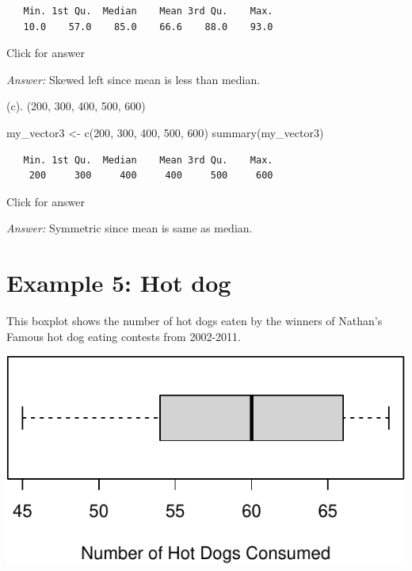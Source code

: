 \documentclass[
]{book}
\newenvironment{Shaded}{\begin{snugshade}}{\end{snugshade}}
\newcommand{\AttributeTok}[1]{\textcolor[rgb]{0.77,0.63,0.00}{#1}}
\newcommand{\DecValTok}[1]{\textcolor[rgb]{0.00,0.00,0.81}{#1}}
\newcommand{\FunctionTok}[1]{\textcolor[rgb]{0.00,0.00,0.00}{#1}}
\newcommand{\NormalTok}[1]{#1}
\newcommand{\OtherTok}[1]{\textcolor[rgb]{0.56,0.35,0.01}{#1}}
\newcommand{\SpecialCharTok}[1]{\textcolor[rgb]{0.00,0.00,0.00}{#1}}
\newcommand{\StringTok}[1]{\textcolor[rgb]{0.31,0.60,0.02}{#1}}
\begin{document}
\begin{verbatim}
   Min. 1st Qu.  Median    Mean 3rd Qu.    Max. 
   10.0    57.0    85.0    66.6    88.0    93.0 
\end{verbatim}

Click for answer

\emph{Answer:} Skewed left since mean is less than median.

(c). (200, 300, 400, 500, 600)

\begin{Shaded}
\begin{Highlighting}[]
\NormalTok{my\_vector3 }\OtherTok{\textless{}{-}} \FunctionTok{c}\NormalTok{(}\DecValTok{200}\NormalTok{, }\DecValTok{300}\NormalTok{, }\DecValTok{400}\NormalTok{, }\DecValTok{500}\NormalTok{, }\DecValTok{600}\NormalTok{)}
\FunctionTok{summary}\NormalTok{(my\_vector3)}
\end{Highlighting}
\end{Shaded}

\begin{verbatim}
   Min. 1st Qu.  Median    Mean 3rd Qu.    Max. 
    200     300     400     400     500     600 
\end{verbatim}

Click for answer

\emph{Answer:} Symmetric since mean is same as median.

\hypertarget{example-5-hot-dog}{%
\section{Example 5: Hot dog}\label{example-5-hot-dog}}

This boxplot shows the number of hot dogs eaten by the winners of Nathan's Famous hot dog eating contests from 2002-2011.

\begin{Shaded}
\end{Shaded}

\includegraphics[width=1\linewidth]{Class_Activity_5_files/figure-latex/unnamed-chunk-22-1}
\end{document}

